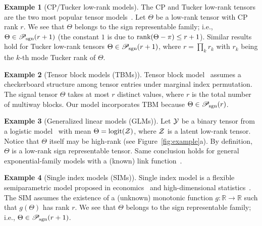 \documentclass{article}
\theoremstyle{plain}
\theoremstyle{definition}
\newtheorem{example}{Example}
\def\rank{\textup{rank}}
\def\caliP{\mathscr{P}_{\textup{sgn}}}
\begin{document}
\vspace{.05cm}
\begin{example}[CP/Tucker low-rank models] The CP and Tucker low-rank tensors are the two most popular tensor models~\citep{kolda2009tensor}. Let $\Theta$ be a low-rank tensor with CP rank $r$. We see that $\Theta$ belongs to the sign representable family; i.e., $\Theta\in\caliP(r+1)$ (the constant $1$ is due to $\rank(\Theta-\pi)\leq r+1$). Similar results hold for Tucker low-rank tensors $\Theta\in\caliP(r+1)$, where $r=\prod_kr_k$ with $r_k$ being the $k$-th mode Tucker rank of $\Theta$.  
\end{example} 
\vspace{.1cm}

\begin{example}[Tensor block models (TBMs)] Tensor block model~\citep{wang2019multiway,chi2020provable} assumes a checkerboard structure among tensor entries under marginal index permutation. The signal tensor $\Theta$ takes at most $r$ distinct values, where $r$ is the total number of multiway blocks. Our model incorporates TBM because $\Theta \in \caliP(r)$. 
\end{example}
\vspace{.1cm}

\begin{example}[Generalized linear models (GLMs)] Let $\mathcal{Y}$ be a binary tensor from a logistic model~\citep{wang2018learning} with mean $\Theta=\text{logit}(\mathcal{Z})$, where $\mathcal{Z}$ is a latent low-rank tensor. Notice that $\Theta$ itself may be high-rank (see Figure~\ref{fig:example}a). By definition, $\Theta$ is a low-rank sign representable tensor. Same conclusion holds for general exponential-family models with a (known) link function~\citep{hong2020generalized}. 
\end{example}
\vspace{.1cm}

\begin{example}[Single index models (SIMs)] Single index model is a flexible semiparametric model proposed in economics~\citep{robinson1988root} and high-dimensional statistics~\citep{balabdaoui2019least,ganti2017learning}. The SIM assumes the existence of a (unknown) monotonic function $g\colon \mathbb{R}\to \mathbb{R}$ such that $g(\Theta)$ has rank $r$. We see that $\Theta$ belongs to the sign representable family; i.e., $\Theta\in \caliP(r+1)$. 
\end{example}
\vspace{.1cm}
\end{document}
